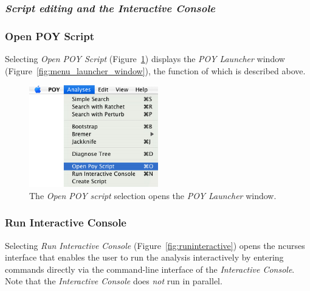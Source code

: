 \subsubsection{\emph{Script editing and the Interactive Console}}

\subsubsection{Open POY Script}

Selecting \emph{Open POY Script} (Figure~\ref{fig:open_poy_script}) displays the \emph{POY Launcher} 
window (Figure~\ref{fig:menu_launcher_window}), the function of which is described above.

\begin{figure}[htpb]
    \begin{center}
        \includegraphics[width=0.5\textwidth]{figures/openpoyscript_menu.jpg}
    \end{center}
    \caption{The \emph{Open POY script} selection opens the \emph{POY Launcher} window.}
    \label{fig:open_poy_script}
\end{figure}

\subsubsection{Run Interactive Console}

Selecting \emph{Run Interactive Console} (Figure~\ref{fig:runinteractive}) opens the ncurses interface
that enables the user to run the analysis interactively by entering
\poy commands directly via the command-line interface of the \emph{Interactive
Console}. Note that the \emph{Interactive Console} does \emph{not} run in parallel.

